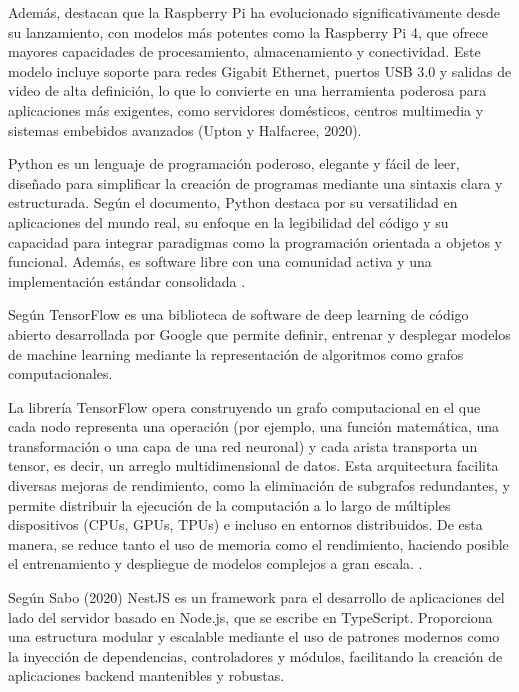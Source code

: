 Además, \citeauthor{upton_raspberry_2020} \citeyear{upton_raspberry_2020} destacan que la Raspberry Pi ha evolucionado significativamente desde su lanzamiento, con modelos más potentes como la Raspberry Pi 4, que ofrece mayores capacidades de procesamiento, almacenamiento y conectividad. Este modelo incluye soporte para redes Gigabit Ethernet, puertos USB 3.0 y salidas de video de alta definición, lo que lo convierte en una herramienta poderosa para aplicaciones más exigentes, como servidores domésticos, centros multimedia y sistemas embebidos avanzados (Upton y Halfacree, 2020).


Python es un lenguaje de programación poderoso, elegante y fácil de leer, diseñado para simplificar la creación de programas mediante una sintaxis clara y estructurada. Según el documento, Python destaca por su versatilidad en aplicaciones del mundo real, su enfoque en la legibilidad del código y su capacidad para integrar paradigmas como la programación orientada a objetos y funcional. Además, es software libre con una comunidad activa y una implementación estándar consolidada \cite{yuill_python_2006}.


Según \citeauthor{goldsborough_tour_2016} \citeyear{goldsborough_tour_2016} TensorFlow es una biblioteca de software de deep learning de código abierto desarrollada por Google que permite definir, entrenar y desplegar modelos de machine learning mediante la representación de algoritmos como grafos computacionales.

La librería TensorFlow opera construyendo un grafo computacional en el que cada nodo representa una operación (por ejemplo, una función matemática, una transformación o una capa de una red neuronal) y cada arista transporta un tensor, es decir, un arreglo multidimensional de datos. Esta arquitectura facilita diversas  mejoras de rendimiento, como la eliminación de subgrafos redundantes, y permite distribuir la ejecución de la computación a lo largo de múltiples dispositivos (CPUs, GPUs, TPUs) e incluso en entornos distribuidos. De esta manera, se reduce tanto el uso de memoria como el rendimiento, haciendo posible el entrenamiento y despliegue de modelos complejos a gran escala. \cite{goldsborough_tour_2016}.


Según \citeauthor{sabo_nestjs_2020} \citeyear{sabo_nestjs_2020} Sabo (2020) NestJS es un framework para el desarrollo de aplicaciones del lado del servidor basado en Node.js, que se escribe en TypeScript. Proporciona una estructura modular y escalable mediante el uso de patrones modernos como la inyección de dependencias, controladores y módulos, facilitando la creación de aplicaciones backend mantenibles y robustas.

